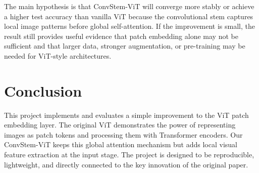 \documentclass[letterpaper]{article}
\begin{document}
The main hypothesis is that ConvStem-ViT will converge more stably or achieve a
higher test accuracy than vanilla ViT because the convolutional stem captures
local image patterns before global self-attention. If the improvement is small,
the result still provides useful evidence that patch embedding alone may not be
sufficient and that larger data, stronger augmentation, or pre-training may be
needed for ViT-style architectures.

\section{Conclusion}

This project implements and evaluates a simple improvement to the ViT patch
embedding layer. The original ViT demonstrates the power of representing images
as patch tokens and processing them with Transformer encoders. Our ConvStem-ViT
keeps this global attention mechanism but adds local visual feature extraction
at the input stage. The project is designed to be reproducible, lightweight, and
directly connected to the key innovation of the original paper.


\end{document}
